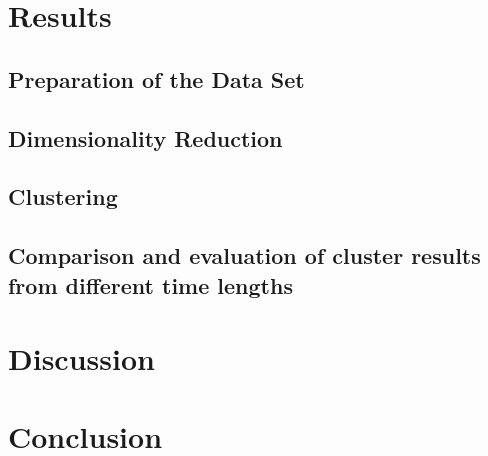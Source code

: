 \section{Results}
\label{section:Experiment}


  \subsection{Preparation of the Data Set}
  \label{section:ExperimentPreparationDataSet}
  

  \subsection{Dimensionality Reduction}
  \label{section:DimensionalityReduction}
  

  \subsection{Clustering}
  \label{section:ExperimentClustering}
  

  \subsection{Comparison and evaluation of cluster results from different time lengths}
  \label{section:ExperimentComparisonTimeLengths}
  
  

\section{Discussion}
\label{section:Discussion}



\section{Conclusion}
\label{section:Conclusion}


